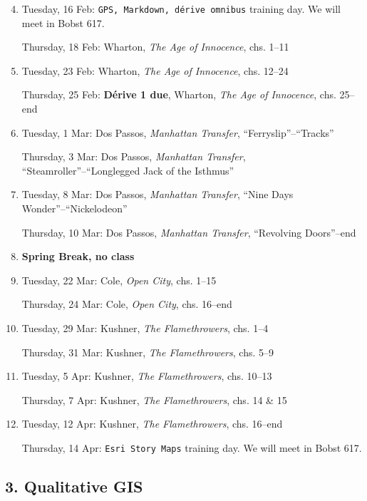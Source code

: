 \begin{enumerate}
 \setcounter{enumi}{3}
\item Tuesday, 16 Feb: \texttt{GPS, Markdown, dérive omnibus} training day. We will meet in Bobst 617.

  Thursday, 18 Feb: Wharton, \textit{The Age of Innocence}, chs. 1--11

  \item Tuesday, 23 Feb: Wharton, \textit{The Age of Innocence},  chs. 12--24

    Thursday, 25 Feb: \textbf{\small Dérive 1 due}, Wharton,  \textit{The Age of Innocence}, chs. 25--end
  
  \item Tuesday, 1 Mar: Dos Passos, \textit{Manhattan Transfer}, “Ferryslip”--“Tracks”

    Thursday, 3 Mar: Dos Passos,  \textit{Manhattan Transfer}, “Steamroller”--“Longlegged Jack of the Isthmus”

  \item Tuesday, 8 Mar: Dos Passos,  \textit{Manhattan Transfer}, “Nine Days Wonder”--“Nickelodeon”

    Thursday, 10 Mar: Dos Passos,  \textit{Manhattan Transfer}, “Revolving Doors”--end

  \item \textbf{Spring Break, no class}

  \item Tuesday, 22 Mar: Cole, \textit{Open City}, chs. 1--15

    Thursday, 24 Mar: Cole,  \textit{Open City}, chs. 16--end

  \item Tuesday, 29 Mar: Kushner, \textit{The Flamethrowers}, chs. 1--4

    Thursday, 31 Mar: Kushner, \textit{The Flamethrowers}, chs. 5--9

  \item Tuesday, 5 Apr: Kushner, \textit{The Flamethrowers}, chs. 10--13 
  
    Thursday, 7 Apr: Kushner, \textit{The Flamethrowers}, chs. 14 \& 15

  \item Tuesday, 12 Apr: Kushner, \textit{The Flamethrowers}, chs. 16--end 

    Thursday, 14 Apr: \texttt{Esri Story Maps} training day. We will meet in Bobst 617.

\end{enumerate}

\subsection{3. Qualitative GIS}

